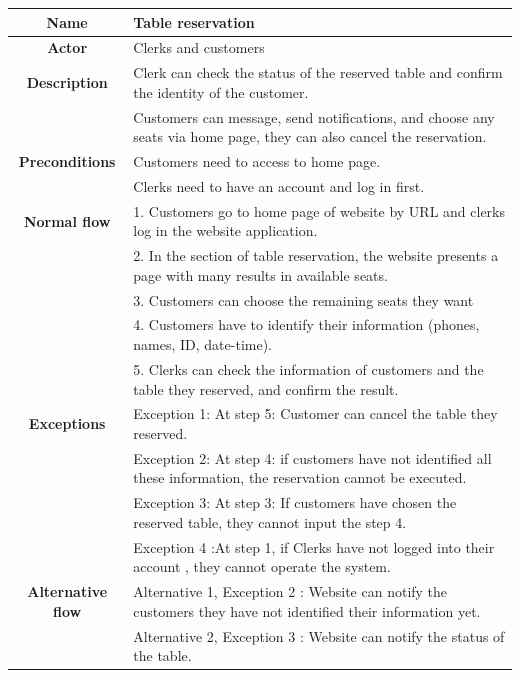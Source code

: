 \documentclass[11pt]{article}
\begin{document}
    \begin{table}[!h]
    \centering
        \begin{tabular}{|c|p{14cm}|}
        \hline
        \textbf{Name}  & \textbf{Table reservation} \\
        \hline
        \textbf{Actor} & Clerks and customers\\
        \hline
        \textbf{Description} & Clerk can check the status of the reserved table and confirm the identity of the customer.\\
        {} & {Customers can message, send notifications, and choose any seats via home page, they can also cancel the reservation}.\\
        \hline
        \textbf{Preconditions} & Customers need to access to home page.\\
        {} & Clerks need to have an account and log in first.\\
        \hline
        \textbf{Normal flow} & 1. Customers go to home page of website by URL and clerks log in the website application.\\
        {} & 2. In the section of table reservation, the website presents a page with many results in available seats.\\
        {} & 3. Customers can choose  the remaining seats they want\\
        {} & 4. Customers have to identify their information (phones, names, ID, date-time).\\
        {} & 5. Clerks can check the information of customers and the table they reserved, and confirm the result.\\
        \hline
        \textbf{Exceptions} & Exception 1: At step 5: Customer can cancel the table they reserved.\\
        {} & Exception 2: At step 4: if customers have not identified all these information, the reservation cannot be executed.\\
        {} & Exception 3: At step 3: If customers have chosen the reserved table, they cannot input the step 4.\\
        {} & Exception 4 :At step 1, if Clerks have not logged into their account , they cannot operate the system.\\
        \hline
        \textbf{Alternative flow} & Alternative 1, Exception 2 : Website can notify the customers they have not identified their information yet.\\
        {}  & Alternative 2, Exception 3 : Website can notify the status of the table.\\
        \hline
        \end{tabular}
    \end{table}
\pagebreak
    
\end{document}
